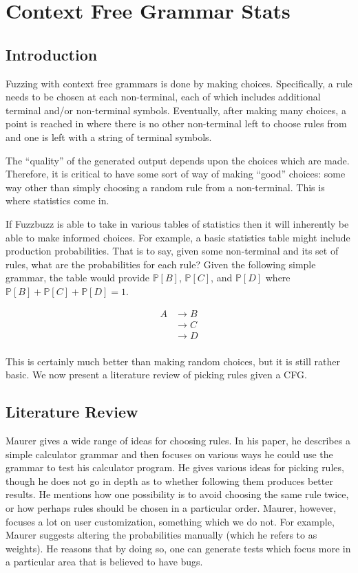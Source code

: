 \section{Context Free Grammar Stats}
\label{cfgstats}
\subsection{Introduction}
Fuzzing with context free grammars is done by making choices. Specifically, a
rule needs to be chosen at each non-terminal, each of which includes additional
terminal and/or non-terminal symbols. Eventually, after making many choices, a
point is reached in where there is no other non-terminal left to choose rules
from and one is left with a string of terminal symbols.

The ``quality'' of the generated output depends upon the choices
which are made. Therefore, it is critical to have some sort of way of making
``good'' choices: some way other than simply choosing a random rule from a
non-terminal. This is where statistics come in.

If Fuzzbuzz is able to take in various tables of statistics then it will
inherently be able to make informed choices. For example, a basic statistics
table might include production probabilities. That is to say, given some
non-terminal and its set of rules, what are the probabilities for each rule?
Given the following simple grammar, the table would provide $\mathbb{P}[B]$,
$\mathbb{P}[C]$, and $\mathbb{P}[D]$ where $\mathbb{P}[B] + \mathbb{P}[C] +
\mathbb{P}[D] = 1$.

\begin{align*}
A &\rightarrow B \\
&\rightarrow C \\
&\rightarrow D \\
\end{align*}

\noindent
This is certainly much better than making random choices, but it is still
rather basic. We now present a literature review of picking rules given a CFG.

\subsection{Literature Review}

Maurer\cite{Maurer1990} gives a wide range of ideas for choosing rules. In his
paper, he describes a simple calculator grammar and then focuses on various
ways he could use the grammar to test his calculator program. He gives various
ideas for picking rules, though he does not go in depth as to whether following
them produces better results. He mentions how one possibility is to avoid
choosing the same rule twice, or how perhaps rules should be chosen in a
particular order. Maurer, however, focuses a lot on user customization,
something which we do not. For example, Maurer suggests altering the
probabilities manually (which he refers to as weights). He reasons that by
doing so, one can generate tests which focus more in a particular area that is
believed to have bugs.

